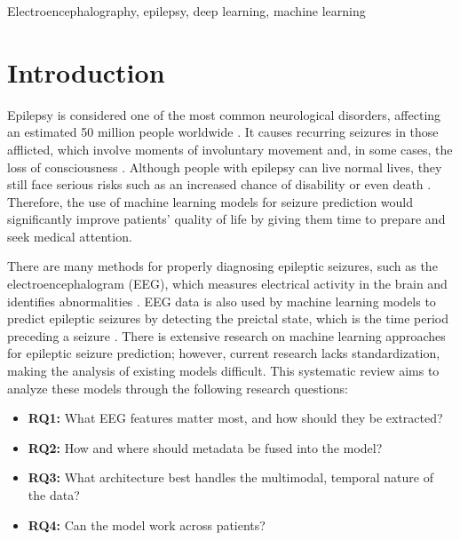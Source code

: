 \documentclass[conference]{IEEEtran}
\begin{document}
\begin{IEEEkeywords}
Electroencephalography, epilepsy, deep learning, machine learning
\end{IEEEkeywords}

\section{Introduction}
Epilepsy is considered one of the most common neurological disorders, affecting an estimated 50 million people worldwide \cite{who2024epilepsy}. It causes recurring seizures in those afflicted, which involve moments of involuntary movement and, in some cases, the loss of consciousness \cite{who2024epilepsy}. Although people with epilepsy can live normal lives, they still face serious risks such as an increased chance of disability or even death \cite{ninds2025epilepsy}. Therefore, the use of machine learning models for seizure prediction would significantly improve patients' quality of life by giving them time to prepare and seek medical attention. 

There are many methods for properly diagnosing epileptic seizures, such as the electroencephalogram (EEG), which measures electrical activity in the brain and identifies abnormalities \cite{ninds2025epilepsy}. EEG data is also used by machine learning models to predict epileptic seizures by detecting the preictal state, which is the time period preceding a seizure \cite{mourad2025seizurerecognition}. There is extensive research on machine learning approaches for epileptic seizure prediction; however, current research lacks standardization, making the analysis of existing models difficult. This systematic review aims to analyze these models through the following research questions:

\begin{itemize}
\item \textbf{RQ1:} What EEG features matter most, and how should they be extracted?

\item \textbf{RQ2:} How and where should metadata be fused into the model?

\item \textbf{RQ3:} What architecture best handles the multimodal, temporal nature of the data?

\item \textbf{RQ4:} Can the model work across patients?

\end{itemize}
\end{document}
